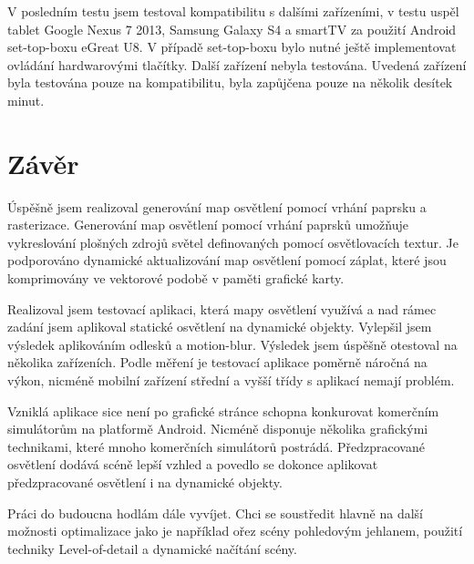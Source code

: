 \documentclass[11pt,twoside,a4paper]{book}
\begin{document}
V posledním testu jsem testoval kompatibilitu s dalšími zařízeními, v testu uspěl tablet Google Nexus 7 2013, Samsung Galaxy S4 a smartTV za použití Android set-top-boxu eGreat U8. V případě set-top-boxu bylo nutné ještě implementovat ovládání hardwarovými tlačítky. Další zařízení nebyla testována. Uvedená zařízení byla testována pouze na kompatibilitu, byla zapůjčena pouze na několik desítek minut.

\chapter{Závěr}

Úspěšně jsem realizoval generování map osvětlení pomocí vrhání paprsku a rasterizace. Generování map osvětlení pomocí vrhání paprsků umožňuje vykreslování plošných zdrojů světel definovaných pomocí osvětlovacích textur. Je podporováno dynamické aktualizování map osvětlení pomocí záplat, které jsou komprimovány ve vektorové podobě v paměti grafické karty.

Realizoval jsem testovací aplikaci, která mapy osvětlení využívá a nad rámec zadání jsem aplikoval statické osvětlení na dynamické objekty. Vylepšil jsem výsledek aplikováním odlesků a motion-blur. Výsledek jsem úspěšně otestoval na několika zařízeních. Podle měření je testovací aplikace poměrně náročná na výkon, nicméně mobilní zařízení střední a vyšší třídy s aplikací nemají problém.

Vzniklá aplikace sice není po grafické stránce schopna konkurovat komerčním simulátorům na platformě Android. Nicméně disponuje několika grafickými technikami, které mnoho komerčních simulátorů postrádá. Předzpracované osvětlení dodává scéně lepší vzhled a povedlo se dokonce aplikovat předzpracované osvětlení i na dynamické objekty.

Práci do budoucna hodlám dále vyvíjet. Chci se soustředit hlavně na další možnosti optimalizace jako je například ořez scény pohledovým jehlanem, použití techniky Level-of-detail a dynamické načítání scény.


%

%
{
\raggedright

}
\end{document}
